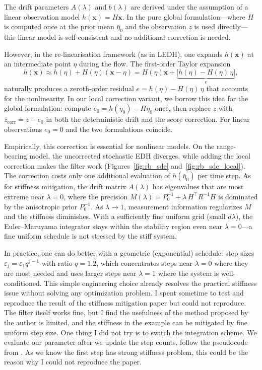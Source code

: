 \documentclass{article}
\renewcommand{\v}[1]{ \ensuremath{ {\mathbf{#1}} }}
\begin{document}
The drift parameters $A(\lambda)$ and $b(\lambda)$ are derived under the assumption of a linear observation model $h(\v{x}) = H\v{x}$. In the pure global formulation---where $H$ is computed once at the prior mean $\bar\eta_0$ and the observation $z$ is used directly---this linear model is self-consistent and no additional correction is needed.

However, in the re-linearisation framework (as in LEDH), one expands $h(\v{x})$ at an intermediate point $\eta$ during the flow. The first-order Taylor expansion
\[
  h(\v{x}) \approx h(\eta) + H(\eta)(\v{x} - \eta) = H(\eta)\v{x} + \underbrace{\bigl[h(\eta) - H(\eta)\,\eta\bigr]}_{e},
\]
naturally produces a zeroth-order residual $e = h(\eta) - H(\eta)\,\eta$ that accounts for the nonlinearity. In our local correction variant, we borrow this idea for the global formulation: compute $e_0 = h(\bar\eta_0) - H\bar\eta_0$ once, then replace $z$ with $z_{\mathrm{corr}} = z - e_0$ in both the deterministic drift and the score correction. For linear observations $e_0 = 0$ and the two formulations coincide.

Empirically, this correction is essential for nonlinear models. On the range-bearing model, the uncorrected stochastic EDH diverges, while adding the local correction makes the filter work (Figures~\ref{fig:rb_sde} and~\ref{fig:rb_sde_local}). The correction costs only one additional evaluation of $h(\bar\eta_0)$ per time step.
As for stiffness mitigation,  the drift matrix $A(\lambda)$ has eigenvalues that are most extreme near $\lambda = 0$, where the precision $M(\lambda) = P_0^{-1} + \lambda\,H^\top R^{-1} H$ is dominated by the anisotropic prior $P_0^{-1}$. As $\lambda \to 1$, measurement information regularizes $M$ and the stiffness diminishes. With a sufficiently fine uniform grid (small $d\lambda$), the Euler--Maruyama integrator stays within the stability region even near $\lambda = 0$---a fine uniform schedule is not stressed by the stiff system.

In practice, one can do better with a geometric (exponential) schedule: step sizes $\varepsilon_j = \varepsilon_1 q^{j-1}$ with ratio $q = 1.2$, which concentrates steps near $\lambda = 0$ where they are most needed and uses larger steps near $\lambda = 1$ where the system is well-conditioned. This simple engineering choice already resolves the practical stiffness issue without solving any optimization problem. I spent sometime to test and reproduce the result of the stiffness mitigation paper but could not reproduce. The filter itself works fine, but I find the usefulness of the method proposed by the author is limited, and the stiffness in the example can be mitigated by fine uniform step size. One thing I did not try is to switch the integration scheme. We evaluate our parameter after we update the step counts, follow the pseudocode from \cite{ding2012implementation}. As we know the first step has strong stiffness problem, this could be the reason why I could not reproduce the paper. 
\end{document}
